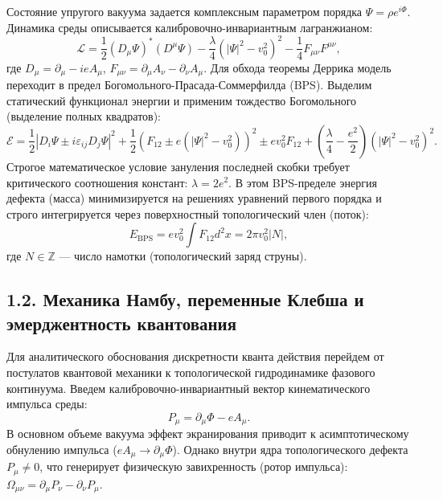 \documentclass[11pt,a4paper]{article}
\begin{document}
	Состояние упругого вакуума задается комплексным параметром порядка $\Psi = \rho e^{i\Phi}$. Динамика среды описывается калибровочно-инвариантным лагранжианом:
	\begin{equation}
		\mathcal{L} = \frac{1}{2} (D_\mu \Psi)^* (D^\mu \Psi) - \frac{\lambda}{4} (|\Psi|^2 - v_0^2)^2 - \frac{1}{4} F_{\mu\nu} F^{\mu\nu},
		\label{eq:lagrangian}
	\end{equation}
	где $D_\mu = \partial_\mu - i e A_\mu$, $F_{\mu\nu} = \partial_\mu A_\nu - \partial_\nu A_\mu$. 
	Для обхода теоремы Деррика модель переходит в предел Богомольного-Прасада-Соммерфилда (BPS). Выделим статический функционал энергии и применим тождество Богомольного (выделение полных квадратов):
	\begin{equation}
		\mathcal{E} = \frac{1}{2} |D_i \Psi \pm i \varepsilon_{ij} D_j \Psi|^2 + \frac{1}{2} \left(F_{12} \pm e(|\Psi|^2 - v_0^2)\right)^2 \pm e v_0^2 F_{12} + \left(\frac{\lambda}{4} - \frac{e^2}{2}\right) (|\Psi|^2 - v_0^2)^2.
	\end{equation}
	Строгое математическое условие зануления последней скобки требует критического соотношения констант: $\lambda = 2e^2$. В этом BPS-пределе энергия дефекта (масса) минимизируется на решениях уравнений первого порядка и строго интегрируется через поверхностный топологический член (поток):
	\begin{equation}
		E_{\text{BPS}} = e v_0^2 \int F_{12} d^2x = 2\pi v_0^2 |N|,
	\end{equation}
	где $N \in \mathbb{Z}$ — число намотки (топологический заряд струны).
	
	\subsection{1.2. Механика Намбу, переменные Клебша и эмерджентность квантования}
	Для аналитического обоснования дискретности кванта действия перейдем от постулатов квантовой механики к топологической гидродинамике фазового континуума. 
	Введем калибровочно-инвариантный вектор кинематического импульса среды:
	\begin{equation}
		P_\mu = \partial_\mu \Phi - e A_\mu.
	\end{equation}
	В основном объеме вакуума эффект экранирования приводит к асимптотическому обнулению импульса ($e A_\mu \to \partial_\mu \Phi$). Однако внутри ядра топологического дефекта $P_\mu \neq 0$, что генерирует физическую завихренность (ротор импульса): $\Omega_{\mu\nu} = \partial_\mu P_\nu - \partial_\nu P_\mu$.
	
\end{document}
